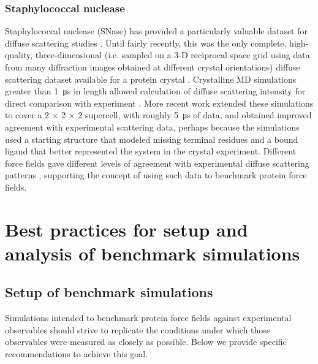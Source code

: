 \documentclass[9pt,review]{livecoms}
\begin{document}
\subsubsection{Staphylococcal nuclease}
\label{sub2:staph_nuclease}

Staphylococcal nuclease (SNase) has provided a particularly valuable dataset for diffuse scattering studies \cite{wall_three-dimensional_1997}.
Until fairly recently, this was the only complete, high-quality, three-dimensional (i.e. sampled on a 3-D reciprocal space grid using data from many diffraction images obtained at different crystal orientations) diffuse scattering dataset available for a protein crystal \cite{wall_conformational_2014}.
Crystalline MD simulations greater than \qty{1}{\micro\second} in length allowed calculation of diffuse scattering intensity for direct comparison with experiment \cite{wall_conformational_2014}.
More recent work \cite{wall_internal_2018} extended these simulations to cover a 2 $\times$ 2 $\times$ 2 supercell, with roughly \qty{5}{\micro\second} of data, and obtained improved agreement with experimental scattering data, perhaps because the simulations used a starting structure that modeled missing terminal residues and a bound ligand that better represented the system in the crystal experiment.
Different force fields gave different levels of agreement with experimental diffuse scattering patterns \cite{wych_liquid-like_2019}, supporting the concept of using such data to benchmark protein force fields.

\section{Best practices for setup and analysis of benchmark simulations}
\label{sec:best_practices}

\subsection{Setup of benchmark simulations}
\label{sub:best_practices_setup}

Simulations intended to benchmark protein force fields against experimental observables should strive to replicate the conditions under which those observables were measured as closely as possible. Below we provide specific recommendations to achieve this goal.
\end{document}
